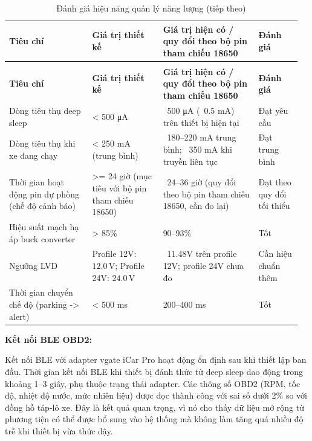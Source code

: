 \documentclass[a4paper]{extarticle}
\newcommand{\thesissettableid}[2]{%
  \renewcommand{\thetable}{#1}%
  \renewcommand{\theHtable}{#2}%
}
\begin{document}
{\thesissettableid{5.1}{tab-ch5-anh-gia-hieu-nang-quan-ly-nang-luong}
\def\LTcaptype{table}
\begin{longtable}{|L{0.272\linewidth}|L{0.231\linewidth}|L{0.311\linewidth}|L{0.141\linewidth}|}
\caption{Đánh giá hiệu năng quản lý năng lượng}\label{tab:ch5-anh-gia-hieu-nang-quan-ly-nang-luong}\\
\hline \textbf{Tiêu chí} & \textbf{Giá trị thiết kế} & \textbf{Giá trị hiện có / quy đổi theo bộ pin tham chiếu
18650} & \textbf{Đánh giá} \\
\hline
\endfirsthead
\caption[]{Đánh giá hiệu năng quản lý năng lượng (tiếp theo)}\\
\hline \textbf{Tiêu chí} & \textbf{Giá trị thiết kế} & \textbf{Giá trị hiện có / quy đổi theo bộ pin tham chiếu
18650} & \textbf{Đánh giá} \\
\hline
\endhead
\hline
\endfoot
\endlastfoot
Dòng tiêu thụ deep sleep & \textless{} 500 μA & ~500 μA
(~0.5 mA) trên thiết bị hiện tại & Đạt yêu cầu \\\hline
Dòng tiêu thụ khi xe đang chạy & \textless{} 250 mA (trung bình) &
~180--220 mA trung bình; ~350 mA khi truyền
liên tục & Đạt trung bình \\\hline
Thời gian hoạt động pin dự phòng (chế độ cảnh báo) & \textgreater= 24 giờ
(mục tiêu với bộ pin tham chiếu 18650) & ~24--36 giờ (quy đổi theo
bộ pin tham chiếu 18650, cần đo lại) & Đạt theo quy đổi tối thiểu \\\hline
Hiệu suất mạch hạ áp buck converter & \textgreater{} 85\% & 90--93\% & Tốt \\\hline
Ngưỡng LVD & Profile 12V: \(12.0\,\mathrm{V}\); Profile 24V: \(24.0\,\mathrm{V}\) &
~11.48V trên profile 12V; profile 24V chưa đo & Cần hiệu
chuẩn thêm \\\hline
Thời gian chuyển chế độ (parking -\textgreater{} alert) & \textless{}
500 ms & 200--400 ms & Tốt \\\hline
\end{longtable}
}


\textbf{Kết nối BLE OBD2:}

Kết nối BLE với adapter vgate iCar Pro hoạt động ổn định sau khi thiết
lập ban đầu. Thời gian kết nối BLE khi thiết bị đánh thức từ deep sleep
dao động trong khoảng 1--3 giây, phụ thuộc trạng thái adapter. Các thông
số OBD2 (RPM, tốc độ, nhiệt độ nước, mức nhiên liệu) được đọc thành công
với sai số dưới 2\% so với đồng hồ táp-lô xe. Đây là kết quả quan trọng,
vì nó cho thấy dữ liệu mở rộng từ phương tiện có thể được bổ sung vào
hệ thống mà không làm tăng quá nhiều độ trễ khi thiết bị vừa thức dậy.
\end{document}
